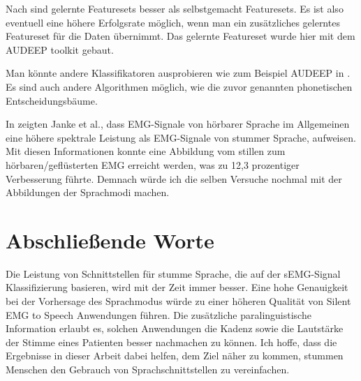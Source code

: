 Nach \cite{diener2020towards} sind gelernte Featuresets besser als selbstgemacht Featuresets. Es ist also eventuell eine höhere Erfolgsrate möglich, wenn man ein zusätzliches gelerntes Featureset für die Daten übernimmt. Das gelernte Featureset wurde hier mit dem AUDEEP toolkit gebaut. 

Man könnte andere Klassifikatoren ausprobieren wie zum Beispiel AUDEEP in  \cite{diener2020towards}. Es sind auch andere Algorithmen möglich, wie die zuvor genannten phonetischen Entscheidungsbäume\cite{janke2011investigations}.

In \cite{janke2010spectral} zeigten Janke et al., dass EMG-Signale von hörbarer Sprache im Allgemeinen eine höhere spektrale Leistung als EMG-Signale von stummer Sprache, aufweisen. Mit diesen Informationen konnte eine Abbildung vom stillen zum hörbaren/geflüsterten EMG erreicht werden, was zu 12,3 prozentiger Verbesserung führte. Demnach würde ich die selben Versuche nochmal mit der Abbildungen der Sprachmodi machen.

\section{Abschließende Worte}
Die Leistung von Schnittstellen für stumme Sprache, die auf der sEMG-Signal Klassifizierung basieren, wird mit der Zeit immer besser.
Eine hohe Genauigkeit bei der Vorhersage des Sprachmodus würde zu einer höheren Qualität von Silent EMG to Speech Anwendungen führen. Die zusätzliche paralinguistische Information erlaubt es, solchen Anwendungen die Kadenz sowie die Lautstärke der Stimme eines Patienten besser nachmachen zu können.
Ich hoffe, dass die Ergebnisse in dieser Arbeit dabei helfen, dem Ziel näher zu kommen,  stummen Menschen den Gebrauch von Sprachschnittstellen zu vereinfachen.

